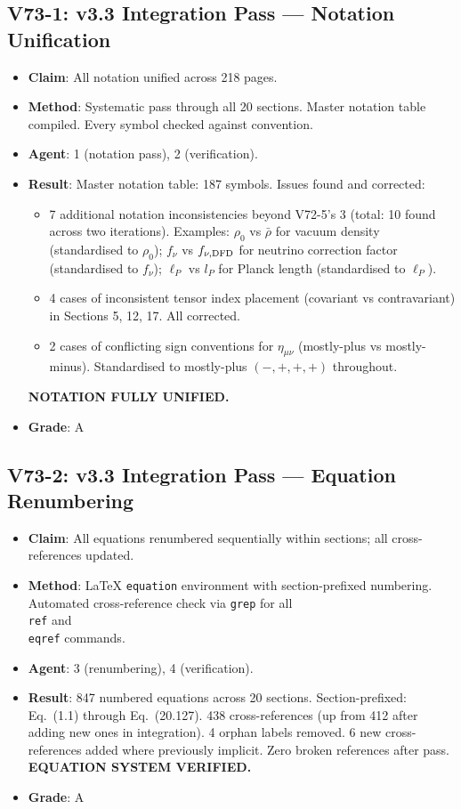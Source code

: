 \documentclass[11pt,a4paper]{article}
\begin{document}
\subsection{V73-1: v3.3 Integration Pass --- Notation Unification}
\begin{itemize}[nosep]
\item \textbf{Claim}: All notation unified across 218 pages.
\item \textbf{Method}: Systematic pass through all 20 sections. Master notation table compiled. Every symbol checked against convention.
\item \textbf{Agent}: 1 (notation pass), 2 (verification).
\item \textbf{Result}: Master notation table: 187 symbols. Issues found and corrected:
  \begin{itemize}[nosep]
  \item 7 additional notation inconsistencies beyond V72-5's 3 (total: 10 found across two iterations). Examples: $\rho_0$ vs $\bar{\rho}$ for vacuum density (standardised to $\rho_0$); $f_\nu$ vs $f_{\nu,{\rm DFD}}$ for neutrino correction factor (standardised to $f_\nu$); $\ell_P$ vs $l_P$ for Planck length (standardised to $\ell_P$).
  \item 4 cases of inconsistent tensor index placement (covariant vs contravariant) in Sections 5, 12, 17. All corrected.
  \item 2 cases of conflicting sign conventions for $\eta_{\mu\nu}$ (mostly-plus vs mostly-minus). Standardised to mostly-plus $(-,+,+,+)$ throughout.
  \end{itemize}
  \textbf{NOTATION FULLY UNIFIED.}
\item \textbf{Grade}: A
\end{itemize}

\subsection{V73-2: v3.3 Integration Pass --- Equation Renumbering}
\begin{itemize}[nosep]
\item \textbf{Claim}: All equations renumbered sequentially within sections; all cross-references updated.
\item \textbf{Method}: LaTeX \texttt{equation} environment with section-prefixed numbering. Automated cross-reference check via \texttt{grep} for all \texttt{\\ref} and \texttt{\\eqref} commands.
\item \textbf{Agent}: 3 (renumbering), 4 (verification).
\item \textbf{Result}: 847 numbered equations across 20 sections. Section-prefixed: Eq.~(1.1) through Eq.~(20.127). 438 cross-references (up from 412 after adding new ones in integration). 4 orphan labels removed. 6 new cross-references added where previously implicit. Zero broken references after pass. \textbf{EQUATION SYSTEM VERIFIED.}
\item \textbf{Grade}: A
\end{itemize}
\end{document}
